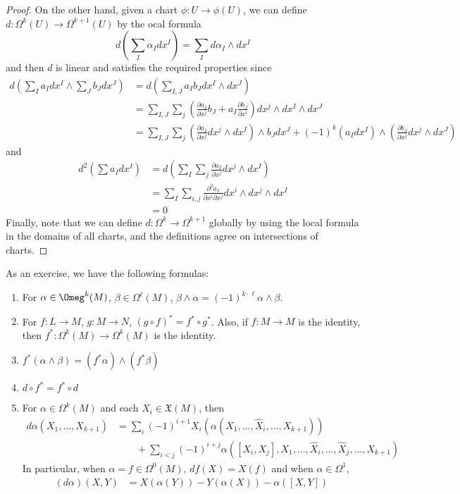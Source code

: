 \documentclass[11pt, a4paper]{memoir}
\newcommand{\agspace}{\ensuremath{\phantom{--}}}
\theoremstyle{change}
\theoremstyle{plain}
\theoremstyle{nonumberplain}
\newtheorem{proof}{Proof}
\newcommand{\prt}[2]{\ensuremath{\frac{\partial #1}{\partial #2}}}
\newcommand{\prtt}[3]{\ensuremath{\frac{\partial^2 #1}{\partial #2\partial #3}}}
\numberwithin{equation}{section}
\begin{document}
\begin{proof}
    On the other hand, given a chart $\phi:U\to\phi(U)$, we can define $d:\Omega^k(U)\to\Omega^{k+1}(U)$ by the ocal formula
    \begin{equation*}
        d(\sum_I\alpha_Idx^I)=\sum_Id\alpha_I\wedge dx^I
    \end{equation*}
    and then $d$ is linear and satisfies the required properties since
    \begin{align*}
        d\left(\sum_Ia_Idx^I\wedge\sum_Jb_Jdx^J\right) &= d\left(\sum_{I,J}a_Ib_Jdx^I\wedge dx^J\right)\\
                                                       &= \sum_{I,J}\sum_j\left(\prt{a_I}{x^j}b_J+a_I\prt{b_J}{x^i}\right)dx^j\wedge dx^I\wedge dx^J\\
                                                       &= \sum_{I,J}\sum_j\left(\prt{a_I}{x^j}dx^j\wedge dx^I\right)\wedge b_Jdx^J+(-1)^k(a_Idx^I)\wedge\left(\prt{b_J}{x^j}dx^j\wedge dx^J\right)
    \end{align*}
    and
    \begin{align*}
        d^2(\sum a_Idx^I) &= d\left(\sum_I\sum_j\prt{a_I}{x^j}dx^j\wedge dx^I\right)\\
                          &= \sum_I\sum_{i,j}\prtt{a_I}{x^i}{x^j}dx^i\wedge dx^j\wedge dx^I\\
                          &= 0
    \end{align*}
    Finally, note that we can define $d:\Omega^k\to\Omega^{k+1}$ globally by using the local formula in the domains of all charts, and the definitions agree on intersections of charts.
\end{proof}
As an exercise, we have the following formulas:
\begin{enumerate}[nl,r]
    \item For $\alpha\in\Omeg^k(M)$, $\beta\in\Omega^\ell(M)$, $\beta\wedge\alpha=(-1)^{k\cdot\ell}\alpha\wedge\beta$.
    \item For $f:L\to M$, $g:M\to N$, $(g\circ f)^*=f^*\circ g^*$.
        Also, if $f:M\to M$ is the identity, then $f^*:\Omega^k(M)\to\Omega^k(M)$ is the identity.
    \item $f^*(\alpha\wedge\beta)=(f^*\alpha)\wedge(f^*\beta)$
    \item $d\circ f^*=f^*\circ d$
    \item For $\alpha\in\Omega^k(M)$ and each $X_i\in\mathfrak{X}(M)$, then
        \begin{align*}
            d\alpha(X_1,\ldots,X_{k+1}) &= \sum_i(-1)^{i+1}X_i(\alpha(X_1,\ldots,\widehat X_i,\ldots,X_{k+1}))\\
                                        &\agspace +\sum_{i<j}(-1)^{i+j}\alpha\left([X_i,X_j],X_1,\ldots,\widehat X_i,\ldots,\widehat X_j,\ldots,X_{k+1}\right)
        \end{align*}
        In particular, when $\alpha=f\in\Omega^0(M)$, $df(X)=X(f)$ and when $\alpha\in\Omega^1$,
        \begin{align*}
            (d\alpha)(X,Y) &= X(\alpha(Y))-Y(\alpha(X))-\alpha([X,Y])
        \end{align*}
\end{enumerate}
\end{document}
